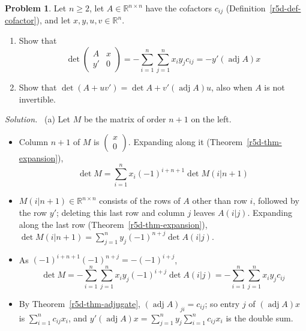 \documentclass[12pt]{article}
\newcommand{\R}{\mathbb R}
\theoremstyle{definition}
\newtheorem{problem}{Problem}
\newenvironment{solution}{\par\noindent\textit{Solution.}\ }{\par\smallskip}
\begin{document}
\begin{problem}\label{r5d-ex-pr-bordered}
Let \(n\geqslant2\), let \(A\in\R^{n\times n}\) have the cofactors \(c_{ij}\) (Definition~\ref{r5d-def-cofactor}), and let
\(x,y,u,v\in\R^n\).
\begin{enumerate}
\item Show that
\[
\det\begin{pmatrix}A&x\\y'&0\end{pmatrix}=-\sum_{i=1}^n\sum_{j=1}^nx_iy_jc_{ij}=-y'(\operatorname{adj}A)x
\]
\item Show that \(\det(A+uv')=\det A+v'(\operatorname{adj}A)u\), also when \(A\) is not invertible.
\end{enumerate}
\end{problem}
\begin{solution}
(a) Let \(M\) be the matrix of order \(n+1\) on the left.
\begin{itemize}
\item Column \(n+1\) of \(M\) is \(\left(\begin{smallmatrix}x\\0\end{smallmatrix}\right)\). Expanding along it
(Theorem~\ref{r5d-thm-expansion}),
\[
\det M=\sum_{i=1}^nx_i(-1)^{i+n+1}\det M(i|n+1)
\]
\item \(M(i|n+1)\in\R^{n\times n}\) consists of the rows of \(A\) other than row \(i\), followed by the row \(y'\); deleting
this last row and column \(j\) leaves \(A(i|j)\). Expanding along the last row (Theorem~\ref{r5d-thm-expansion}),
\(\det M(i|n+1)=\sum_{j=1}^ny_j(-1)^{n+j}\det A(i|j)\).
\item As \((-1)^{i+n+1}(-1)^{n+j}=-(-1)^{i+j}\),
\[
\det M=-\sum_{i=1}^n\sum_{j=1}^nx_iy_j(-1)^{i+j}\det A(i|j)=-\sum_{i=1}^n\sum_{j=1}^nx_iy_jc_{ij}
\]
\item By Theorem~\ref{r5d-thm-adjugate}, \((\operatorname{adj}A)_{ji}=c_{ij}\); so entry \(j\) of \((\operatorname{adj}A)x\) is
\(\sum_{i=1}^nc_{ij}x_i\), and \(y'(\operatorname{adj}A)x=\sum_{j=1}^ny_j\sum_{i=1}^nc_{ij}x_i\) is the double sum.
\end{itemize}


\end{solution}
\end{document}
